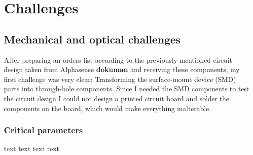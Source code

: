 \chapter{Challenges}
\label{sec:challenges}



\section{Mechanical and optical challenges}
\label{sub:mechanicalChallenges}

After preparing an orders list according to the previously mentioned circuit design taken from Alphasense \textbf{dokuman} and receiving these components, my first challenge was very clear: Transforming the surface-mount device (SMD) parts into through-hole components. Since I needed the SMD components to test the circuit design I could not design a printed circuit board and solder the components on the board, which would make everything inalterable.  

\subsection{Critical parameters}
\label{sub:criticalParameters}

text text text text
